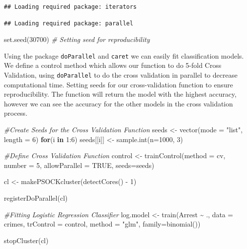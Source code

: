 \documentclass[
]{article}
\newenvironment{Shaded}{\begin{snugshade}}{\end{snugshade}}
\newcommand{\AttributeTok}[1]{\textcolor[rgb]{0.77,0.63,0.00}{#1}}
\newcommand{\CommentTok}[1]{\textcolor[rgb]{0.56,0.35,0.01}{\textit{#1}}}
\newcommand{\ConstantTok}[1]{\textcolor[rgb]{0.00,0.00,0.00}{#1}}
\newcommand{\ControlFlowTok}[1]{\textcolor[rgb]{0.13,0.29,0.53}{\textbf{#1}}}
\newcommand{\DecValTok}[1]{\textcolor[rgb]{0.00,0.00,0.81}{#1}}
\newcommand{\FunctionTok}[1]{\textcolor[rgb]{0.00,0.00,0.00}{#1}}
\newcommand{\NormalTok}[1]{#1}
\newcommand{\OtherTok}[1]{\textcolor[rgb]{0.56,0.35,0.01}{#1}}
\newcommand{\SpecialCharTok}[1]{\textcolor[rgb]{0.00,0.00,0.00}{#1}}
\newcommand{\StringTok}[1]{\textcolor[rgb]{0.31,0.60,0.02}{#1}}
\begin{document}
\begin{verbatim}
## Loading required package: iterators
\end{verbatim}

\begin{verbatim}
## Loading required package: parallel
\end{verbatim}

\begin{Shaded}
\begin{Highlighting}[]
\FunctionTok{set.seed}\NormalTok{(}\DecValTok{30700}\NormalTok{) }\CommentTok{\# Setting seed for reproducibility}
\end{Highlighting}
\end{Shaded}

Using the package \texttt{doParallel} and \texttt{caret} we can easily
fit classification models. We define a control method which allows our
function to do 5-fold Cross Validation, using \texttt{doParallel} to do
the cross validation in parallel to decrease computational time. Setting
seeds for our cross-validation function to ensure reproducibility. The
function will return the model with the highest accuracy, however we can
see the accuracy for the other models in the cross validation process.

\begin{Shaded}
\begin{Highlighting}[]
\CommentTok{\#Create Seeds for the Cross Validation Function}
\NormalTok{seeds }\OtherTok{\textless{}{-}} \FunctionTok{vector}\NormalTok{(}\AttributeTok{mode =} \StringTok{"list"}\NormalTok{, }\AttributeTok{length =} \DecValTok{6}\NormalTok{)}
\ControlFlowTok{for}\NormalTok{(i }\ControlFlowTok{in} \DecValTok{1}\SpecialCharTok{:}\DecValTok{6}\NormalTok{) seeds[[i]] }\OtherTok{\textless{}{-}} \FunctionTok{sample.int}\NormalTok{(}\AttributeTok{n=}\DecValTok{1000}\NormalTok{, }\DecValTok{3}\NormalTok{)}

\CommentTok{\#Define Cross Validation Function}
\NormalTok{control }\OtherTok{\textless{}{-}} \FunctionTok{trainControl}\NormalTok{(}\AttributeTok{method =} \StringTok{\textquotesingle{}cv\textquotesingle{}}\NormalTok{, }\AttributeTok{number =} \DecValTok{5}\NormalTok{, }\AttributeTok{allowParallel =} \ConstantTok{TRUE}\NormalTok{, }\AttributeTok{seeds=}\NormalTok{seeds)}

\NormalTok{cl }\OtherTok{\textless{}{-}} \FunctionTok{makePSOCKcluster}\NormalTok{(}\FunctionTok{detectCores}\NormalTok{() }\SpecialCharTok{{-}} \DecValTok{1}\NormalTok{)}

\FunctionTok{registerDoParallel}\NormalTok{(cl)}

\CommentTok{\#Fitting Logistic Regression Classifier}
\NormalTok{log.model }\OtherTok{\textless{}{-}} \FunctionTok{train}\NormalTok{(Arrest }\SpecialCharTok{\textasciitilde{}}\NormalTok{ .,}
               \AttributeTok{data =}\NormalTok{ crimes,}
               \AttributeTok{trControl =}\NormalTok{ control,}
               \AttributeTok{method =} \StringTok{"glm"}\NormalTok{,}
               \AttributeTok{family=}\FunctionTok{binomial}\NormalTok{())}

\FunctionTok{stopCluster}\NormalTok{(cl)}
\end{Highlighting}
\end{Shaded}
\end{document}

